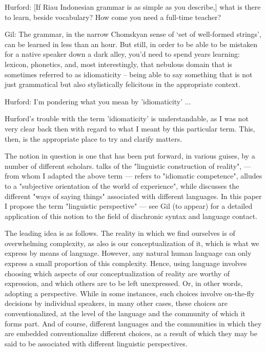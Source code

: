 \documentclass[output=paper,colorlinks,citecolor=brown
]{langscibook}
\begin{document}
\begin{displayquote}
    Hurford:	[If Riau Indonesian grammar is as simple as you describe,] what is there to learn, beside vocabulary? How come you need a full-time teacher?

    Gil: The grammar, in the narrow Chomskyan sense of ‘set of well-formed strings’, can be learned in less than an hour. But still, in order to be able to be mistaken for a native speaker down a dark alley, you’d need to spend years learning: lexicon, phonetics, and, most interestingly, that nebulous domain that is sometimes referred to as idiomaticity – being able to say something that is not just grammatical but also stylistically felicitous in the appropriate context.

    Hurford:	I'm pondering what you mean by 'idiomaticity' ...
\end{displayquote}

Hurford's trouble with the term 'idiomaticity' is understandable, as I was not very clear back then with regard to what I meant by this particular term.  This, then, is the appropriate place to try and clarify matters.

The notion in question is one that has been put forward, in various guises, by a number of different scholars. \citet{grace1987linguistic} talks of the "linguistic construction of reality", \citet{pawlk
} — from whom I adapted the above term — refers to "idiomatic competence", \citet[91]{slobin1996thought} alludes to a "subjective orientation of the world of experience",  while \citet{ross2001contact} discusses the different "ways of saying things" associated with different languages.  In this paper I propose the term "linguistic perspective" — see Gil (to appear) for a detailed application of this notion to the field of diachronic syntax and language contact.

The leading idea is as follows.  The reality in which we find ourselves is of overwhelming complexity, as also is our conceptualization of it, which is what we express by means of language.  However, any natural human language can only express a small proportion of this complexity.  Hence, using language involves choosing which aspects of our conceptualization of reality are worthy of expression, and which others are to be left unexpressed.  Or, in other words, adopting a perspective.  While in some instances, such choices involve on-the-fly decisions by individual speakers, in many other cases, these choices are conventionalized, at the level of the language and the community of which it forms part.  And of course, different languages and the communities in which they are embedded conventionalize different choices, as a result of which they may be said to be associated with different linguistic perspectives.
\end{document}

